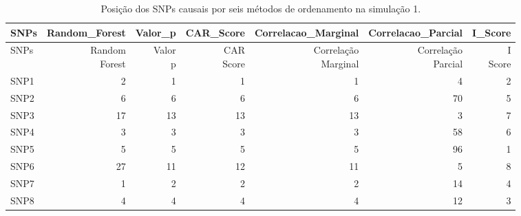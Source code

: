 \begin{table}[H]
\centering
\begin{tabular}{lrrrrrr}
  \hline
SNPs & Random_Forest & Valor_p & CAR_Score & Correlacao_Marginal & Correlacao_Parcial & I_Score \\ 
  \hline
 SNPs & \makecell{Random \\ Forest} & \makecell{Valor \\ p} & \makecell{CAR \\ Score} & \makecell{Correlação \\ Marginal} & \makecell{Correlação \\ Parcial} & \makecell{I \\ Score} \\ \hline
 \hline
SNP1 &   2 &   1 &   1 &   1 &   4 &   2 \\ 
  SNP2 &   6 &   6 &   6 &   6 &  70 &   5 \\ 
  SNP3 &  17 &  13 &  13 &  13 &   3 &   7 \\ 
  SNP4 &   3 &   3 &   3 &   3 &  58 &   6 \\ 
  SNP5 &   5 &   5 &   5 &   5 &  96 &   1 \\ 
  SNP6 &  27 &  11 &  12 &  11 &   5 &   8 \\ 
  SNP7 &   1 &   2 &   2 &   2 &  14 &   4 \\ 
  SNP8 &   4 &   4 &   4 &   4 &  12 &   3 \\ 
   \hline
\end{tabular}
\caption{Posição dos SNPs causais por seis métodos de ordenamento na simulação 1.} 
\label{tab:positions_causais}
\end{table}

